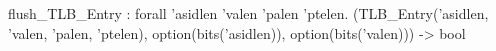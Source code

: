 flush_TLB_Entry : forall 'asidlen 'valen 'palen 'ptelen.
  (TLB_Entry('asidlen, 'valen, 'palen, 'ptelen), option(bits('asidlen)), option(bits('valen))) -> bool